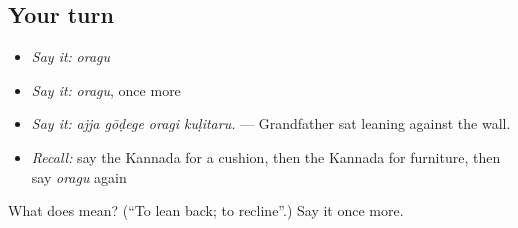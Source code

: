 \subsection*{Your turn}
\begin{itemize}
\raggedright
  \item \emph{Say it:} \emph{oragu}
  \item \emph{Say it:} \emph{oragu}, once more
  \item \emph{Say it:} \emph{ajja gōḍege oragi kuḷitaru.} — Grandfather sat leaning against the wall.
  \item \emph{Recall:} say the Kannada for a cushion, then the Kannada for furniture, then say \emph{oragu} again
\end{itemize}

\begin{tcolorbox}[breakable,colback=teal!4,colframe=teal!35!black,title={Before you move on}]
What does  mean? (\textquotedblleft{}To lean back; to recline\textquotedblright{}.) Say it once more.
\end{tcolorbox}

